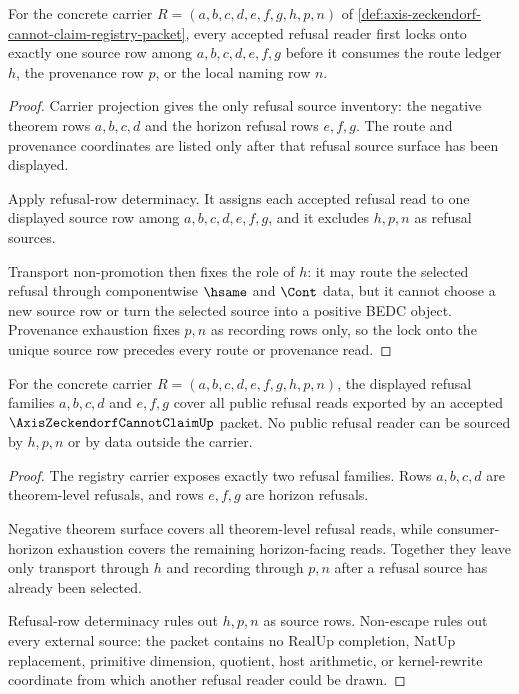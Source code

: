 \begin{theorem}
\label{thm:axis-zeckendorf-cannot-claim-source-lock}
For the concrete carrier $R=(a,b,c,d,e,f,g,h,p,n)$ of \autoref{def:axis-zeckendorf-cannot-claim-registry-packet}, every accepted refusal reader first locks onto exactly one source row among $a,b,c,d,e,f,g$ before it consumes the route ledger $h$, the provenance row $p$, or the local naming row $n$.
\end{theorem}
\begin{proof}
Carrier projection gives the only refusal source inventory: the negative theorem rows $a,b,c,d$ and the horizon refusal rows $e,f,g$. The route and provenance coordinates are listed only after that refusal source surface has been displayed.

Apply refusal-row determinacy. It assigns each accepted refusal read to one displayed source row among $a,b,c,d,e,f,g$, and it excludes $h,p,n$ as refusal sources.

Transport non-promotion then fixes the role of $h$: it may route the selected refusal through componentwise $\hsame$ and $\Cont$ data, but it cannot choose a new source row or turn the selected source into a positive BEDC object. Provenance exhaustion fixes $p,n$ as recording rows only, so the lock onto the unique source row precedes every route or provenance read.
\end{proof}

\begin{theorem}
\label{thm:axis-zeckendorf-cannot-claim-refusal-reader-totality}
For the concrete carrier $R=(a,b,c,d,e,f,g,h,p,n)$, the displayed refusal families $a,b,c,d$ and $e,f,g$ cover all public refusal reads exported by an accepted $\AxisZeckendorfCannotClaimUp$ packet. No public refusal reader can be sourced by $h,p,n$ or by data outside the carrier.
\end{theorem}
\begin{proof}
The registry carrier exposes exactly two refusal families. Rows $a,b,c,d$ are theorem-level refusals, and rows $e,f,g$ are horizon refusals.

Negative theorem surface covers all theorem-level refusal reads, while consumer-horizon exhaustion covers the remaining horizon-facing reads. Together they leave only transport through $h$ and recording through $p,n$ after a refusal source has already been selected.

Refusal-row determinacy rules out $h,p,n$ as source rows. Non-escape rules out every external source: the packet contains no RealUp completion, NatUp replacement, primitive dimension, quotient, host arithmetic, or kernel-rewrite coordinate from which another refusal reader could be drawn.
\end{proof}

